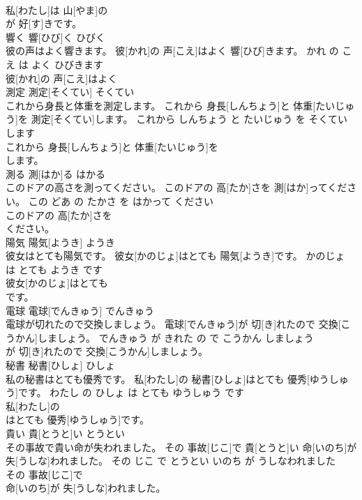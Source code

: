 \documentclass[8pt]{extreport}
\begin{document}
\begin{CJK}{UTF8}{min}
\\	私[わたし]は 山[やま]の
\\	が 好[す]きです。			
\\	響く	響[ひび]く	ひびく	
\\	彼の声はよく響きます。	彼[かれ]の 声[こえ]はよく 響[ひび]きます。	かれ の こえ は よく ひびきます	
\\	彼[かれ]の 声[こえ]はよく
\\	測定	測定[そくてい]	そくてい	
\\	これから身長と体重を測定します。	これから 身長[しんちょう]と 体重[たいじゅう]を 測定[そくてい]します。	これから しんちょう と たいじゅう を そくてい します	
\\	これから 身長[しんちょう]と 体重[たいじゅう]を
\\	します。			
\\	測る	測[はか]る	はかる	
\\	このドアの高さを測ってください。	このドアの 高[たか]さを 測[はか]ってください。	この どあ の たかさ を はかって ください	
\\	このドアの 高[たか]さを
\\	ください。			
\\	陽気	陽気[ようき]	ようき	
\\	彼女はとても陽気です。	彼女[かのじょ]はとても 陽気[ようき]です。	かのじょ は とても ようき です	
\\	彼女[かのじょ]はとても
\\	です。			
\\	電球	電球[でんきゅう]	でんきゅう	
\\	電球が切れたので交換しましょう。	電球[でんきゅう]が 切[き]れたので 交換[こうかん]しましょう。	でんきゅう が きれた の で こうかん しましょう	
\\	が 切[き]れたので 交換[こうかん]しましょう。			
\\	秘書	秘書[ひしょ]	ひしょ	
\\	私の秘書はとても優秀です。	私[わたし]の 秘書[ひしょ]はとても 優秀[ゆうしゅう]です。	わたし の ひしょ は とても ゆうしゅう です	
\\	私[わたし]の
\\	はとても 優秀[ゆうしゅう]です。			
\\	貴い	貴[とうと]い	とうとい	
\\	その事故で貴い命が失われました。	その 事故[じこ]で 貴[とうと]い 命[いのち]が 失[うしな]われました。	その じこ で とうとい いのち が うしなわれました	
\\	その 事故[じこ]で
\\	命[いのち]が 失[うしな]われました。			

\end{CJK}
\end{document}
